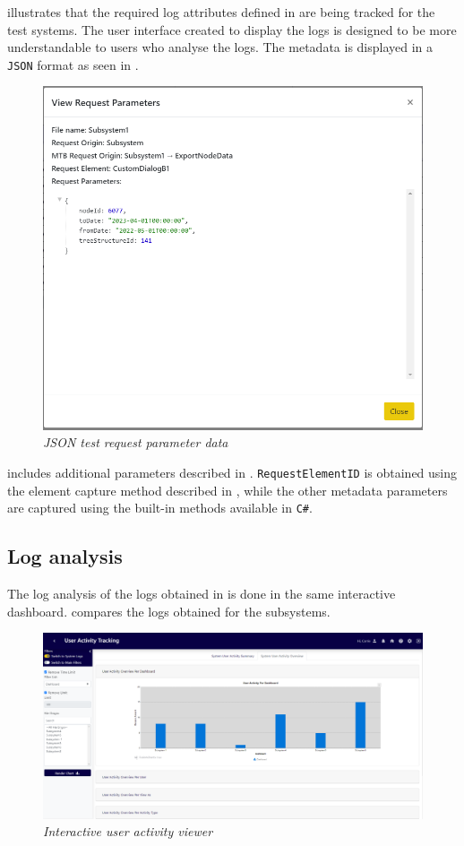  illustrates that the required log attributes defined in  are being tracked for the test systems. The user interface created to display the logs is designed to be more understandable to users who analyse the logs. The metadata is displayed in a \texttt{JSON} format as seen in .

\clearpage

\begin{figure}[!htb]
	\centering %
	\includegraphics[width=0.6\linewidth]{img/ch3/analysis/UAT_request_params.png}
	\caption[JSON test request parameter data]
	{\textit{JSON test request parameter data}}\label{fig:ch3_JSON_Test_Result}
\end{figure}

 includes additional parameters described in . \texttt{RequestElementID} is obtained using the element capture method described in , while the other metadata parameters are captured using the built-in methods available in \texttt{C\#}.

\subsection{Log analysis}
The log analysis of the logs obtained in  is done in the same interactive dashboard.  compares the logs obtained for the subsystems.

\begin{figure}[!htb]
	\centering %
	\includegraphics[width=0.99\linewidth]{img/ch3/analysis/UAT_menu_analysis.png}
	\caption[Interactive user activity viewer]
	{\textit{Interactive user activity viewer}}\label{fig:ch3_UAT_menuAnalysis}
\end{figure}

